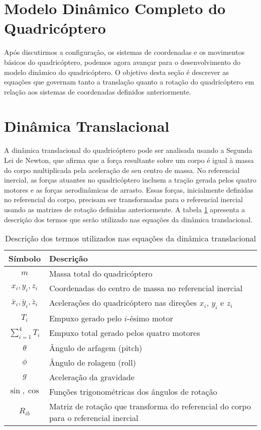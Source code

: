 \section{Modelo Dinâmico Completo do Quadricóptero}

Após discutirmos a configuração, os sistemas de coordenadas e os movimentos básicos do quadricóptero, podemos agora avançar para o desenvolvimento do modelo dinâmico do quadricóptero. O objetivo desta seção é descrever as equações que governam tanto a translação quanto a rotação do quadricóptero em relação aos sistemas de coordenadas definidos anteriormente.

\section{Dinâmica Translacional}

A dinâmica translacional do quadricóptero pode ser analisada usando a Segunda Lei de Newton, que afirma que a força resultante sobre um corpo é igual à massa do corpo multiplicada pela aceleração de seu centro de massa. No referencial inercial, as forças atuantes no quadricóptero incluem a tração gerada pelos quatro motores e as forças aerodinâmicas de arrasto. Essas forças, inicialmente definidas no referencial do corpo, precisam ser transformadas para o referencial inercial usando as matrizes de rotação definidas anteriormente. 
A tabela \ref{tab:termos_dinamica_translacional} apresenta a descrição dos termos que serão utilizado nas equações da dinâmica translacional.

\begin{table}[H]
	\centering
	\begin{tabular}{|c|l|}
		\hline
		\textbf{Símbolo}  & \textbf{Descrição} \\ \hline
		$m$               & Massa total do quadricóptero \\ \hline
		$x_i, y_i, z_i$   & Coordenadas do centro de massa no referencial inercial \\ \hline
		$\ddot{x_i}, \ddot{y_i}, \ddot{z_i}$ & Acelerações do quadricóptero nas direções \(x_i\), \(y_i\) e \(z_i\) \\ \hline
		$T_i$             & Empuxo gerado pelo \(i\)-ésimo motor \\ \hline
		$\sum_{i=1}^{4} T_i$ & Empuxo total gerado pelos quatro motores \\ \hline
		$\theta$          & Ângulo de arfagem (pitch) \\ \hline
		$\phi$            & Ângulo de rolagem (roll) \\ \hline
		$g$               & Aceleração da gravidade \\ \hline
		$\sin, \cos$      & Funções trigonométricas dos ângulos de rotação \\ \hline
		$R_{ib}$          & Matriz de rotação que transforma do referencial do corpo para o referencial inercial \\ \hline
	\end{tabular}
	\caption{Descrição dos termos utilizados nas equações da dinâmica translacional}
	\label{tab:termos_dinamica_translacional}
\end{table}

